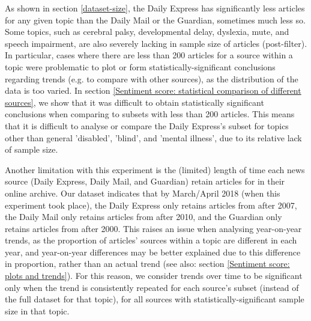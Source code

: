 \documentclass{report}
\newcommand{\textapprox}{\raisebox{0.5ex}{\texttildelow}}  %
\begin{document}
As shown in section \ref{dataset-size}, the Daily Express has significantly less articles for any given topic than the Daily Mail or the Guardian, sometimes much less so.
Some topics, such as cerebral palsy, developmental delay, dyslexia, mute, and speech impairment, are also severely lacking in sample size of articles (post-filter).
In particular, cases where there are less than \textapprox200 articles for a source within a topic were problematic to plot or form statistically-significant conclusions regarding trends (e.g. to compare with other sources), as the distribution of the data is too varied. %
In section \ref{Sentiment score: statistical comparison of different sources}, we show that it was difficult to obtain statistically significant conclusions when comparing to subsets with less than \textapprox200 articles.
This means that it is difficult to analyse or compare the Daily Express's subset for topics other than general 'disabled', 'blind', and 'mental illness', due to its relative lack of sample size.

Another limitation with this experiment is the (limited) length of time each news source (Daily Express, Daily Mail, and Guardian) retain articles for in their online archive.
Our dataset indicates that by March/April 2018 (when this experiment took place), the Daily Express only retains articles from after \textapprox2007, the Daily Mail only retains articles from after \textapprox2010, and the Guardian only retains articles from after \textapprox2000. 
This raises an issue when analysing year-on-year trends, as the proportion of articles' sources within a topic are different in each year, and year-on-year differences may be better explained due to this difference in proportion, rather than an actual trend (see also: section \ref{Sentiment score: plots and trends}).
For this reason, we consider trends over time to be significant only when the trend is consistently repeated for each source's subset (instead of the full dataset for that topic), for all sources with statistically-significant sample size in that topic. 
\end{document}

